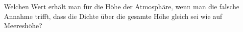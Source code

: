 Welchen Wert erhält man für die Höhe der Atmosphäre, wenn man die falsche Annahme trifft, dass die Dichte über die gesamte Höhe gleich sei wie auf Meereshöhe?
